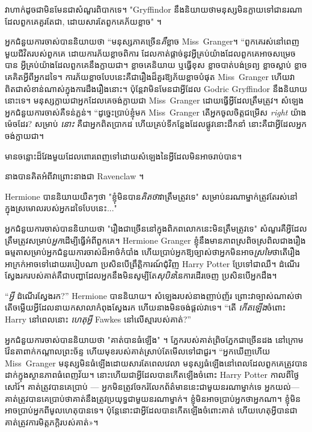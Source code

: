 {{វាហាក់ដូចជាមិនមែនជាសំណួរពិបាកទេ។ "Gryffindor នឹង​និយាយ​ថា​មនុស្ស​មិន​ក្លាយ​ទៅ​ជា​នរណា​ដែល​ពួកគេ​គួរ​តែ​ជា​, ដោយ​សារ​តែ​ពួក​គេ​ភ័យ​ខ្លាច​" ។

អ្នកជំនួយការចាស់បាននិយាយថា “មនុស្សភាគច្រើន\emph{គឺ}ខ្លាច Miss~Granger។ “ពួកគេរស់នៅពេញមួយជីវិតរបស់ពួកគេ ដោយការភ័យខ្លាចពិការ ដែលកាត់ផ្តាច់នូវអ្វីគ្រប់យ៉ាងដែលពួកគេអាចសម្រេចបាន អ្វីគ្រប់យ៉ាងដែលពួកគេនឹងក្លាយជា។ ខ្លាចគេនិយាយ ឬធ្វើខុស ខ្លាចបាត់បង់ទ្រព្យ ខ្លាចស្លាប់ ខ្លាចគេគិតអ្វីពីអ្នកដទៃ។ ការភ័យខ្លាចបែបនេះគឺជារឿងដ៏គួរឱ្យភ័យខ្លាចបំផុត Miss~Granger ហើយវាពិតជាសំខាន់ណាស់ក្នុងការដឹងរឿងនោះ។ ប៉ុន្តែវាមិនមែនជាអ្វីដែល Godric Gryffindor នឹងនិយាយនោះទេ។ មនុស្ស​ក្លាយ​ជា​អ្នក​ដែល​គេ​ចង់​ក្លាយ​ជា Miss~Granger ដោយ​ធ្វើ​អ្វី​ដែល​ត្រឹម​ត្រូវ។ សំឡេង​អ្នក​ជំនួយការ​ចាស់​គឺ​ទន់ភ្លន់។ “ដូច្នេះប្រាប់ខ្ញុំមក Miss~Granger តើអ្នកចូលចិត្តជម្រើស \emph{right} យ៉ាងម៉េចដែរ? សម្រាប់ \emph{នោះ} គឺជាអ្នកពិតប្រាកដ ហើយគ្រប់ទីកន្លែងដែលផ្លូវនោះដឹកនាំ នោះគឺជាអ្វីដែលអ្នកចង់ក្លាយជា។

មានចន្លោះដ៏វែងមួយដែលពោរពេញទៅដោយសំឡេងនៃអ្វីដែលមិនអាចរាប់បាន។

នាងបានគិតអំពីវាព្រោះនាងជា Ravenclaw ។

Hermione បាននិយាយយឺតៗថា "ខ្ញុំមិនបាន\emph{គិតថា}វាត្រឹមត្រូវទេ" សម្រាប់នរណាម្នាក់ត្រូវតែរស់នៅក្នុងស្រមោលរបស់អ្នកដទៃបែបនេះ..."

អ្នកជំនួយការចាស់បាននិយាយថា "រឿងជាច្រើននៅក្នុងពិភពលោកនេះមិនត្រឹមត្រូវទេ" សំណួរគឺអ្វីដែលត្រឹមត្រូវសម្រាប់\emph{អ្នក}ដើម្បីធ្វើអំពីពួកគេ។ Hermione Granger ខ្ញុំនឹងមានភាពស្រពិចស្រពិលជាងរឿងធម្មតាសម្រាប់អ្នកជំនួយការចាស់ដ៏អាថ៌កំបាំង ហើយប្រាប់អ្នកឱ្យច្បាស់ថាអ្នកមិនអាច\emph{ស្រមៃ}ថាតើរឿងអាក្រក់អាចទៅដោយរបៀបណា ប្រសិនបើព្រឹត្តិការណ៍ជុំវិញ Harry Potter ប្រែទៅជាឈឺ។ ដំណើរស្វែងរករបស់គាត់គឺជាបញ្ហាដែលអ្នកនឹងមិនសូម្បីតែ\emph{សុបិន}នៃការដើរចេញ ប្រសិនបើអ្នកដឹង។

“\emph{អ្វី} ដំណើរស្វែងរក?” Hermione បាននិយាយ។ សំឡេងរបស់នាងញាប់ញ័រ ព្រោះវាច្បាស់ណាស់ថា តើចម្លើយអ្វីដែលនាយកសាលាកំពុងស្វែងរក ហើយនាងមិនចង់ផ្តល់វាទេ។ “តើ \emph{កើតឡើង}ចំពោះ Harry នៅពេលនោះ \emph{ហេតុអ្វី} Fawkes នៅលើស្មារបស់គាត់?”

អ្នកជំនួយការចាស់បាននិយាយថា "គាត់បានធំឡើង" ។ ភ្នែករបស់គាត់ព្រិចភ្នែកជាច្រើនដង នៅក្រោមវ៉ែនតាពាក់កណ្តាលព្រះច័ន្ទ ហើយមុខរបស់គាត់ស្រាប់តែមើលទៅជាជួរ។ “អ្នកឃើញហើយ Miss~Granger មនុស្សមិនធំឡើងដោយសារតែពេលវេលា មនុស្សធំឡើងនៅពេលដែលពួកគេត្រូវបានដាក់ក្នុងស្ថានភាពធំពេញវ័យ។ នោះហើយជាអ្វីដែលបានកើតឡើងចំពោះ Harry Potter កាលពីថ្ងៃសៅរ៍។ គាត់ត្រូវបានគេប្រាប់ — អ្នកមិនត្រូវចែករំលែកព័ត៌មាននេះជាមួយនរណាម្នាក់ទេ អ្នកយល់—គាត់ត្រូវបានគេប្រាប់ថាគាត់នឹងត្រូវប្រយុទ្ធជាមួយនរណាម្នាក់។ ខ្ញុំមិនអាចប្រាប់អ្នកថាអ្នកណា។ ខ្ញុំមិនអាចប្រាប់អ្នកពីមូលហេតុបានទេ។ ប៉ុន្តែ​នោះ​ជា​អ្វី​ដែល​បាន​កើត​ឡើង​ចំពោះ​គាត់ ហើយ​ហេតុ​អ្វី​បាន​ជា​គាត់​ត្រូវ​ការ​មិត្ត​ភក្តិ​របស់​គាត់»។

}}
